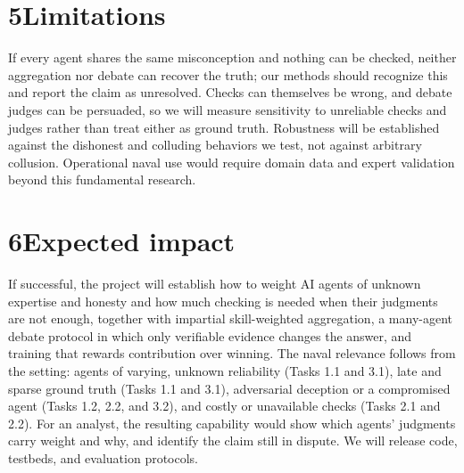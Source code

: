 \documentclass[11pt,letterpaper]{article}
\begin{document}
\section*{5\quad Limitations}
If every agent shares the same misconception and nothing can be checked, neither aggregation nor debate can recover the truth; our methods should recognize this and report the claim as unresolved. Checks can themselves be wrong, and debate judges can be persuaded, so we will measure sensitivity to unreliable checks and judges rather than treat either as ground truth. Robustness will be established against the dishonest and colluding behaviors we test, not against arbitrary collusion. Operational naval use would require domain data and expert validation beyond this fundamental research.

\section*{6\quad Expected impact}
If successful, the project will establish how to weight AI agents of unknown expertise and honesty and how much checking is needed when their judgments are not enough, together with impartial skill-weighted aggregation, a many-agent debate protocol in which only verifiable evidence changes the answer, and training that rewards contribution over winning. The naval relevance follows from the setting: agents of varying, unknown reliability (Tasks 1.1 and 3.1), late and sparse ground truth (Tasks 1.1 and 3.1), adversarial deception or a compromised agent (Tasks 1.2, 2.2, and 3.2), and costly or unavailable checks (Tasks 2.1 and 2.2). For an analyst, the resulting capability would show which agents' judgments carry weight and why, and identify the claim still in dispute. We will release code, testbeds, and evaluation protocols.
\end{document}
